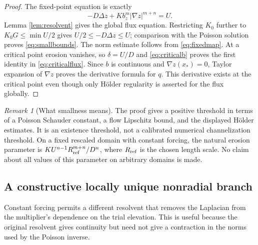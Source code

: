 \documentclass[11pt,a4paper]{article}
\theoremstyle{definition}\newtheorem{definition}[theorem]{Definition}
\theoremstyle{remark}\newtheorem{remark}[theorem]{Remark}
\begin{document}
\begin{proof}
The fixed-point equation is exactly
\[
 -D\Delta z+K b_z^m|\nabla z|^{m+n}=U.
\]
Lemma \ref{lem:resolvent} gives the global flux equation. Restricting $K_0$ further to $K_0G\leq\min U/2$ gives
$U/2\leq-D\Delta z\leq U$; comparison with the Poisson solution proves \eqref{eq:smallbounds}. The norm estimate follows from \eqref{eq:fixedmap}.
At a critical point erosion vanishes, so $\delta=U/D$ and \eqref{eq:criticalb} proves the first identity in \eqref{eq:criticalflux}. Since $b$ is continuous and $\nabla z(x_*)=0$, Taylor expansion of $\nabla z$ proves the derivative formula for $q$. This derivative exists at the critical point even though only H\"older regularity is asserted for the flux globally.
\end{proof}

\begin{remark}[What smallness means]
The proof gives a positive threshold in terms of a Poisson Schauder constant, a flow Lipschitz bound, and the displayed H\"older estimates. It is an existence threshold, not a calibrated numerical channelization threshold. On a fixed rescaled domain with constant forcing, the natural erosion parameter is $K U^{n-1}R_{\rm ref}^{m+n}/D^n$, where $R_{\rm ref}$ is the chosen length scale. No claim about all values of this parameter on arbitrary domains is made.
\end{remark}

\subsection{A constructive locally unique nonradial branch}
Constant forcing permits a different resolvent that removes the Laplacian from
the multiplier's dependence on the trial elevation. This is useful because the
original resolvent gives continuity but need not give a contraction in the
norms used by the Poisson inverse.
\end{document}
